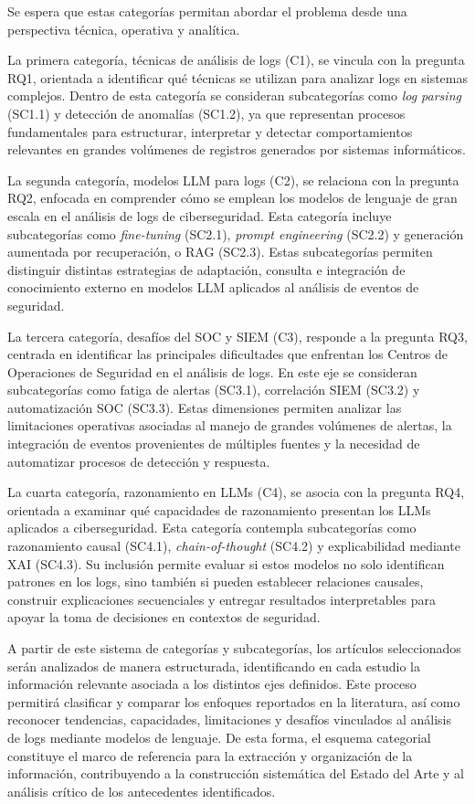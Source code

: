 Se espera que estas categorías permitan abordar el problema desde una perspectiva técnica, operativa y analítica.

La primera categoría, técnicas de análisis de logs (C1), se vincula con la pregunta RQ1, orientada a identificar qué técnicas se utilizan para analizar logs en sistemas complejos. Dentro de esta categoría se consideran subcategorías como \textit{log parsing} (SC1.1) y detección de anomalías (SC1.2), ya que representan procesos fundamentales para estructurar, interpretar y detectar comportamientos relevantes en grandes volúmenes de registros generados por sistemas informáticos.

La segunda categoría, modelos LLM para logs (C2), se relaciona con la pregunta RQ2, enfocada en comprender cómo se emplean los modelos de lenguaje de gran escala en el análisis de logs de ciberseguridad. Esta categoría incluye subcategorías como \textit{fine-tuning} (SC2.1), \textit{prompt engineering} (SC2.2) y generación aumentada por recuperación, o RAG (SC2.3). Estas subcategorías permiten distinguir distintas estrategias de adaptación, consulta e integración de conocimiento externo en modelos LLM aplicados al análisis de eventos de seguridad.

La tercera categoría, desafíos del SOC y SIEM (C3), responde a la pregunta RQ3, centrada en identificar las principales dificultades que enfrentan los Centros de Operaciones de Seguridad en el análisis de logs. En este eje se consideran subcategorías como fatiga de alertas (SC3.1), correlación SIEM (SC3.2) y automatización SOC (SC3.3). Estas dimensiones permiten analizar las limitaciones operativas asociadas al manejo de grandes volúmenes de alertas, la integración de eventos provenientes de múltiples fuentes y la necesidad de automatizar procesos de detección y respuesta.

La cuarta categoría, razonamiento en LLMs (C4), se asocia con la pregunta RQ4, orientada a examinar qué capacidades de razonamiento presentan los LLMs aplicados a ciberseguridad. Esta categoría contempla subcategorías como razonamiento causal (SC4.1), \textit{chain-of-thought} (SC4.2) y explicabilidad mediante XAI (SC4.3). Su inclusión permite evaluar si estos modelos no solo identifican patrones en los logs, sino también si pueden establecer relaciones causales, construir explicaciones secuenciales y entregar resultados interpretables para apoyar la toma de decisiones en contextos de seguridad.

A partir de este sistema de categorías y subcategorías, los artículos seleccionados serán analizados de manera estructurada, identificando en cada estudio la información relevante asociada a los distintos ejes definidos. Este proceso permitirá clasificar y comparar los enfoques reportados en la literatura, así como reconocer tendencias, capacidades, limitaciones y desafíos vinculados al análisis de logs mediante modelos de lenguaje. De esta forma, el esquema categorial constituye el marco de referencia para la extracción y organización de la información, contribuyendo a la construcción sistemática del Estado del Arte y al análisis crítico de los antecedentes identificados.

